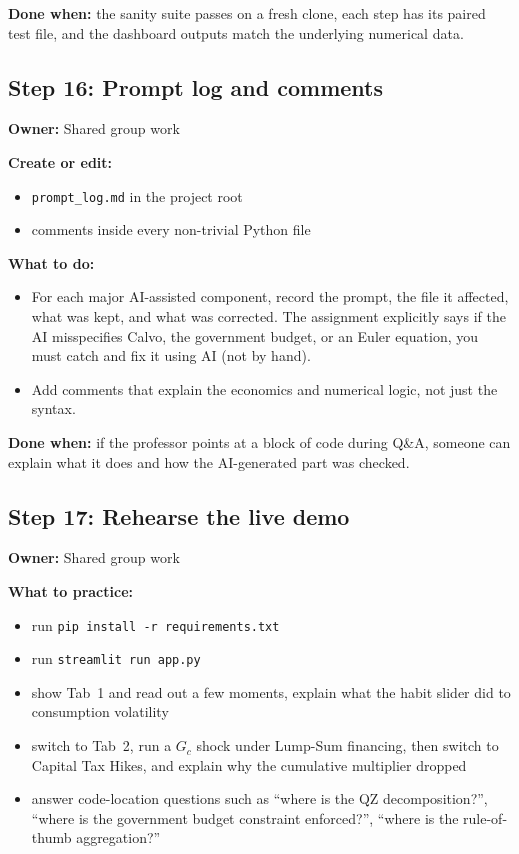 \documentclass[11pt]{article}
\begin{document}
\textbf{Done when:} the sanity suite passes on a fresh clone, each step has its paired test file, and the dashboard outputs match the underlying numerical data.

\subsection{Step 16: Prompt log and comments}
\textbf{Owner:} Shared group work

\textbf{Create or edit:}
\begin{itemize}
    \item \texttt{prompt\_log.md} in the project root
    \item comments inside every non-trivial Python file
\end{itemize}

\textbf{What to do:}
\begin{itemize}
    \item For each major AI-assisted component, record the prompt, the file it affected, what was kept, and what was corrected. The assignment explicitly says if the AI misspecifies Calvo, the government budget, or an Euler equation, you must catch and fix it using AI (not by hand).
    \item Add comments that explain the economics and numerical logic, not just the syntax.
\end{itemize}

\textbf{Done when:} if the professor points at a block of code during Q\&A, someone can explain what it does and how the AI-generated part was checked.

\subsection{Step 17: Rehearse the live demo}
\textbf{Owner:} Shared group work

\textbf{What to practice:}
\begin{itemize}
    \item run \texttt{pip install -r requirements.txt}
    \item run \texttt{streamlit run app.py}
    \item show Tab~1 and read out a few moments, explain what the habit slider did to consumption volatility
    \item switch to Tab~2, run a $G_c$ shock under Lump-Sum financing, then switch to Capital Tax Hikes, and explain why the cumulative multiplier dropped
    \item answer code-location questions such as ``where is the QZ decomposition?'', ``where is the government budget constraint enforced?'', ``where is the rule-of-thumb aggregation?''
\end{itemize}
\end{document}
